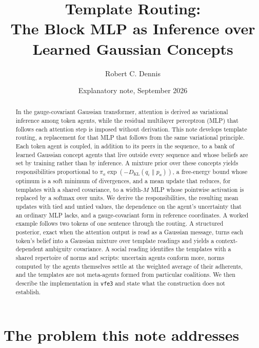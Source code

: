 \documentclass[11pt]{article}
\title{Template Routing:\\ The Block MLP as Inference over Learned Gaussian Concepts}
\author{Robert C. Dennis}
\date{Explanatory note, September 2026}
\theoremstyle{definition}
\theoremstyle{remark}
\newcommand{\KL}{D_{\mathrm{KL}}}
\begin{document}
\maketitle

\begin{abstract}
In the gauge-covariant Gaussian transformer, attention is derived as variational inference among token agents, while the residual multilayer perceptron (MLP) that follows each attention step is imposed without derivation. This note develops template routing, a replacement for that MLP that follows from the same variational principle. Each token agent is coupled, in addition to its peers in the sequence, to a bank of learned Gaussian concept agents that live outside every sequence and whose beliefs are set by training rather than by inference. A mixture prior over these concepts yields responsibilities proportional to $\pi_a\exp(-\KL(q_i\|p_a))$, a free-energy bound whose optimum is a soft minimum of divergences, and a mean update that reduces, for templates with a shared covariance, to a width-$M$ MLP whose pointwise activation is replaced by a softmax over units. We derive the responsibilities, the resulting mean updates with tied and untied values, the dependence on the agent's uncertainty that an ordinary MLP lacks, and a gauge-covariant form in reference coordinates. A worked example follows two tokens of one sentence through the routing. A structured posterior, exact when the attention output is read as a Gaussian message, turns each token's belief into a Gaussian mixture over template readings and yields a context-dependent ambiguity covariance. A social reading identifies the templates with a shared repertoire of norms and scripts: uncertain agents conform more, norms computed by the agents themselves settle at the weighted average of their adherents, and the templates are not meta-agents formed from particular coalitions. We then describe the implementation in \texttt{vfe3} and state what the construction does not establish.
\end{abstract}

\section{The problem this note addresses}
\end{document}
